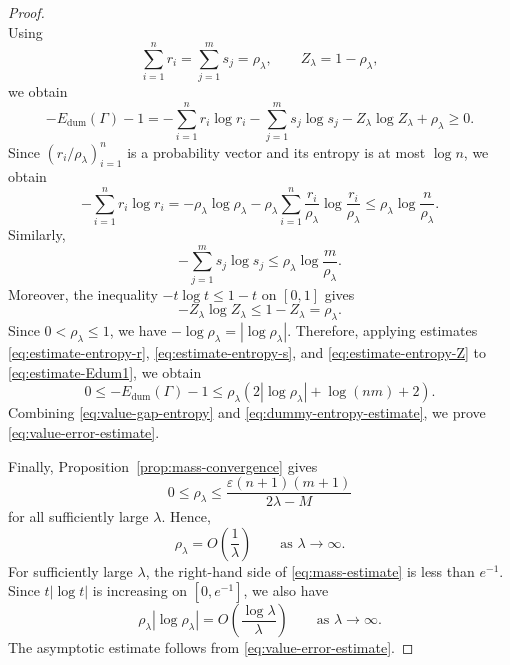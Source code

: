 \documentclass[a4paper,11pt]{article}
\numberwithin{equation}{section}
\newcommand{\eps}{\varepsilon}
\begin{document}
\begin{proof}
\begin{equation}
\end{equation}
Using
\begin{equation*}
  \sum_{i=1}^{n}r_i=\sum_{j=1}^{m}s_j=\rho_{\lambda},\qquad Z_{\lambda}=1-\rho_{\lambda},
\end{equation*}
we obtain
\begin{equation}\label{eq:estimate-Edum1}
  -E_{\mathrm{dum}}(\Gamma)-1 = -\sum_{i = 1}^{n}r_i\log r_i - \sum_{j = 1}^{m}s_j\log s_j - Z_{\lambda}\log Z_{\lambda} + \rho_{\lambda} \geq 0.
\end{equation}
Since $(r_i/\rho_{\lambda})_{i=1}^{n}$ is a probability vector and its entropy is at most $\log n$, we obtain 
\begin{equation}\label{eq:estimate-entropy-r}
  -\sum_{i = 1}^{n}r_i\log r_i = -\rho_{\lambda}\log\rho_{\lambda} - \rho_{\lambda}\sum_{i = 1}^{n}\frac{r_i}{\rho_{\lambda}}\log\frac{r_i}{\rho_{\lambda}} \leq \rho_{\lambda}\log\frac{n}{\rho_{\lambda}}.
\end{equation}
Similarly,
\begin{equation}\label{eq:estimate-entropy-s}
  -\sum_{j = 1}^{m}s_j\log s_j \leq \rho_{\lambda}\log\frac{m}{\rho_{\lambda}}.
\end{equation}
Moreover, the inequality $-t\log t\leq1-t$ on $[0,1]$ gives
\begin{equation}\label{eq:estimate-entropy-Z}
  -Z_{\lambda}\log Z_{\lambda}\leq1-Z_{\lambda}=\rho_{\lambda}.
\end{equation}
Since $0<\rho_{\lambda}\leq1$, we have $-\log\rho_{\lambda}=|\log\rho_{\lambda}|$. Therefore, applying estimates \eqref{eq:estimate-entropy-r}, \eqref{eq:estimate-entropy-s}, and \eqref{eq:estimate-entropy-Z} to \eqref{eq:estimate-Edum1}, we obtain 
\begin{equation}\label{eq:dummy-entropy-estimate}
  0 \leq -E_{\mathrm{dum}}(\Gamma)-1 \leq \rho_{\lambda}\left(2|\log\rho_{\lambda}| + \log(nm) + 2\right).
\end{equation}
Combining \eqref{eq:value-gap-entropy} and \eqref{eq:dummy-entropy-estimate}, we prove \eqref{eq:value-error-estimate}.

Finally, Proposition~\ref{prop:mass-convergence} gives
\begin{equation}\label{eq:mass-estimate}
  0\leq\rho_{\lambda}\leq\frac{\eps(n+1)(m+1)}{2\lambda-M}
\end{equation}
for all sufficiently large $\lambda$. Hence,
\begin{equation*}
  \rho_{\lambda}=O\left(\frac{1}{\lambda}\right) \qquad\text{as }\lambda\to\infty.
\end{equation*}
For sufficiently large $\lambda$, the right-hand side of \eqref{eq:mass-estimate} is less than $e^{-1}$. Since $t|\log t|$ is increasing on $[0,e^{-1}]$, we also have
\begin{equation*}
  \rho_{\lambda}|\log\rho_{\lambda}|=O\left(\frac{\log\lambda}{\lambda}\right) \qquad\text{as }\lambda\to\infty.
\end{equation*}
The asymptotic estimate follows from \eqref{eq:value-error-estimate}.
\end{proof}
\end{document}
